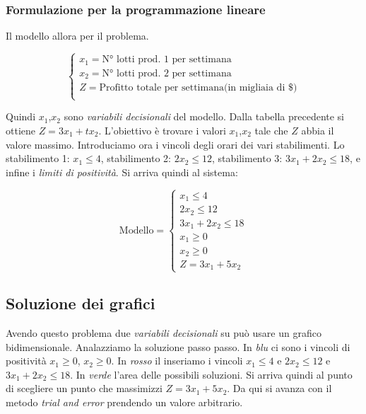 \documentclass{article}
\begin{document}
\subsubsection{Formulazione per la programmazione lineare}
Il modello allora per il problema.

$$
  \begin{cases}
    x_1 = \text{N° lotti prod. 1 per settimana}                 \\
    x_2 = \text{N° lotti prod. 2 per settimana}                 \\
    Z = \text{Profitto totale per settimana(in migliaia di \$)} \\
  \end{cases}
$$

Quindi $x_1$,$x_2$ sono \textit{variabili decisionali} del modello. Dalla tabella precedente si ottiene $Z = 3x_1+tx_2$. L'obiettivo è trovare i valori $x_1$,$x_2$ tale che $Z$ abbia il valore massimo. Introduciamo ora i vincoli degli orari dei vari stabilimenti. Lo stabilimento 1: $x_1\le4$, stabilimento 2: $2x_2\le12$, stabilimento 3: $3x_1+2x_2\le18$, e infine i \textit{limiti di positività}. Si arriva quindi al sistema:

$$ \text{Modello}=
  \begin{cases}
    x_1 \le 4          \\
    2x_2 \le 12        \\
    3x_1 + 2x_2 \le 18 \\
    x_1 \ge 0          \\
    x_2 \ge 0          \\
    Z = 3x_1 + 5x_2
  \end{cases}
$$

\subsection{Soluzione dei grafici}
Avendo questo problema due \textit{variabili decisionali} su può usare un grafico bidimensionale. Analazziamo la soluzione passo passo. In \textit{blu} ci sono i vincoli di positività $x_1\ge0$, $x_2\ge0$. In \textit{rosso} il inseriamo i vincoli $x_1\le4$ e $2x_2\le12$ e $3x_1+2x_2\le18$. In \textit{verde} l'area delle possibili soluzioni. Si arriva quindi al punto di scegliere un punto che massimizzi $Z=3x_1+5x_2$. Da qui si avanza con il metodo \textit{trial and error} prendendo un valore arbitrario.
\end{document}
